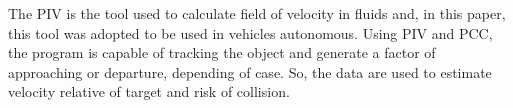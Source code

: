 The PIV is the tool used to calculate field of velocity in fluids and, in this paper, this tool was adopted to be used in vehicles autonomous.
Using PIV and PCC, the program is capable of tracking the object and generate a factor of approaching or departure, depending of case. So, 
the data are used to estimate velocity relative of target and risk of collision.